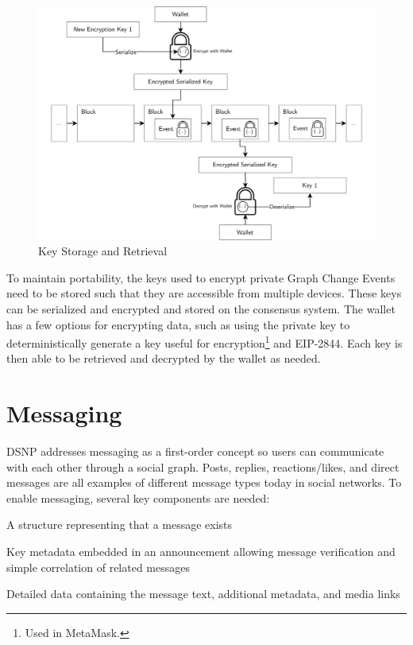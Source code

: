 \documentclass[12pt,letterpaper]{article}
\providecommand{\tightlist}{%
\setlength{\itemsep}{0pt}\setlength{\parskip}{0pt}}
\begin{document}
\begin{figure}
	\includegraphics[width=\linewidth]{figures/Key Storage and Retrieval.png}
	\caption{Key Storage and Retrieval}
	\label{fig:4}
\end{figure}

To maintain portability, the keys used to encrypt private Graph Change Events need to be
stored such that they are accessible from multiple devices. These keys can be serialized and
encrypted and stored on the consensus system. The wallet has a few options for encrypting
data, such as using the private key to deterministically generate a key useful for
encryption\footnote{Used in MetaMask.\cite{metamask_doc}} and EIP-2844.\cite{eip2844} Each
key is then able to be retrieved and decrypted by the wallet as needed.

\section{Messaging}\label{sec:messaging}

DSNP addresses messaging as a first-order concept so users can communicate with each other
through a social graph. Posts, replies, reactions/likes, and direct messages are all
examples of different message types today in social networks. To enable messaging, several
key components are needed:

\begin{samepage}
	\begin{description}
		\tightlist
		\item[Announcement:]
		      A structure representing that a message exists
		\item[Announcement Metadata:]
		      Key metadata embedded in an announcement allowing
		      message verification and simple correlation of related messages
		\item[Content:]
		      Detailed data containing the message text, additional metadata, and media links
	\end{description}
\end{samepage}
\end{document}

